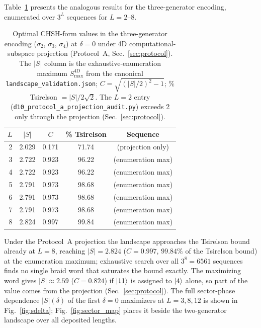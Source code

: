 \documentclass[aps,pra,twocolumn,superscriptaddress,longbibliography,floatfix,nofootinbib]{revtex4-2}
\begin{document}
Table~\ref{tab:3gen} presents the analogous results for the
three-generator encoding, enumerated over $3^L$ sequences
for $L=2$--$8$.

\begin{table}[!htb]
\caption{%
Optimal CHSH-form values in the three-generator encoding ($\sigma_2$,
$\sigma_3$, $\sigma_4$) at $\delta = 0$ under 4D computational-subspace
projection (Protocol~A, Sec.~\ref{sec:protocol}). The $|S|$ column
is the exhaustive-enumeration maximum $S^{4\mathrm{D}}_{\max}$ from the
canonical \texttt{landscape\_validation.json}; $C=\sqrt{(|S|/2)^2-1}$;
\% Tsirelson $=|S|/2\sqrt{2}$. The $L=2$ entry
(\texttt{d10\_protocol\_a\_projection\_audit.py}) exceeds 2 only through
the projection (Sec.~\ref{sec:protocol}).
}
\label{tab:3gen}
\begin{ruledtabular}
\begin{tabular}{rcccc}
$L$ & $|S|$ & $C$ & \% Tsirelson & Sequence \\
\hline
 2 & 2.029 & 0.171 & 71.74 & (projection only) \\
 3 & 2.722 & 0.923 & 96.22 & (enumeration max) \\
 4 & 2.722 & 0.923 & 96.22 & (enumeration max) \\
 5 & 2.791 & 0.973 & 98.68 & (enumeration max) \\
 6 & 2.791 & 0.973 & 98.68 & (enumeration max) \\
 7 & 2.791 & 0.973 & 98.68 & (enumeration max) \\
 8 & 2.824 & 0.997 & 99.84 & (enumeration max) \\
\end{tabular}
\end{ruledtabular}
\end{table}

Under the Protocol~A projection the landscape approaches the Tsirelson
bound already at $L=8$, reaching $|S|=2.824$ ($C=0.997$, $99.84\%$ of the
Tsirelson bound) at the enumeration maximum; exhaustive search over
all $3^8=6561$ sequences finds no single braid word that saturates the
bound exactly. The maximizing word gives $|S| \approx 2.59$ ($C =
0.824$) if $\ket{11}$ is assigned to $\ket{4}$ alone, so part of the
value comes from the projection (Sec.~\ref{sec:protocol}).
The full sector-phase dependence $|S|(\delta)$ of the first
$\delta = 0$ maximizers at $L = 3, 8, 12$ is shown in
Fig.~\ref{fig:sdelta};
Fig.~\ref{fig:sector_map} places it beside the two-generator landscape over
all deposited lengths.
\end{document}

